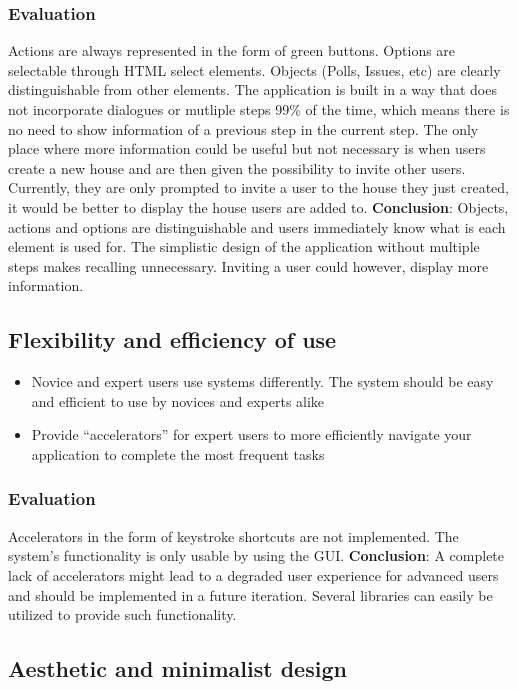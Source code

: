 \subsubsection{Evaluation}
Actions are always represented in the form of green buttons. Options are selectable through HTML select elements. Objects (Polls, Issues, etc) are clearly distinguishable from other elements. The application is built in a way that does not incorporate dialogues or mutliple steps 99\% of the time, which means there is no need to show information of a previous step in the current step. The only place where more information could be useful but not necessary is when users create a new house and are then given the possibility to invite other users. Currently, they are only prompted to invite a user to the house they just created, it would be better to display the house users are added to. \textbf{Conclusion}: Objects, actions and options are distinguishable and users immediately know what is each element is used for. The simplistic design of the application without multiple steps makes recalling unnecessary. Inviting a user could however, display more information.

\subsection{Flexibility and efficiency of use}

\begin{itemize}
    \item Novice and expert users use systems differently. The system should be easy and efficient to use by novices and experts alike
    \item Provide “accelerators” for expert users to more efficiently navigate your application to complete the most frequent tasks
\end{itemize}

\subsubsection{Evaluation}
Accelerators in the form of keystroke shortcuts are not implemented. The system's functionality is only usable by using the GUI. \textbf{Conclusion}: A complete lack of accelerators might lead to a degraded user experience for advanced users and should be implemented in a future iteration. Several libraries can easily be utilized to provide such functionality.

\subsection{Aesthetic and minimalist design}

